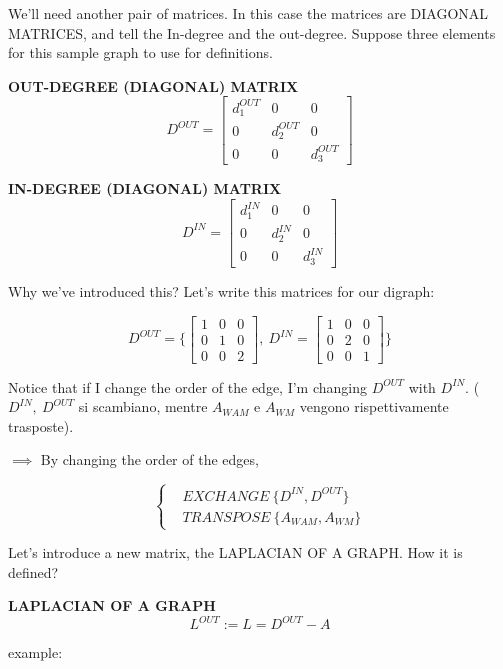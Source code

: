 We'll need another pair of matrices. In this case the matrices are DIAGONAL MATRICES, and tell the In-degree and the out-degree. Suppose three elements for this sample graph to use for definitions.

\begin{defn}{\textbf{OUT-DEGREE (DIAGONAL) MATRIX}}
\[
	D^{OUT} = \begin{bmatrix}d_1^{OUT}&0&0\\0&d_2^{OUT}&0\\0&0&d_3^{OUT}\end{bmatrix}
\]
\end{defn}
\begin{defn}{\textbf{IN-DEGREE (DIAGONAL) MATRIX}}
\[
	D^{IN} = \begin{bmatrix}d_1^{IN}&0&0\\0&d_2^{IN}&0\\0&0&d_3^{IN}\end{bmatrix}
\]
\end{defn}

Why we've introduced this? Let's write this matrices for our digraph:

\[
	D^{OUT} = \Biggl\{ \begin{bmatrix}1&0&0\\0&1&0\\0&0&2\end{bmatrix},\ 
	D^{IN} = \begin{bmatrix}1&0&0\\0&2&0\\0&0&1\end{bmatrix}\Biggr\}
\]

Notice that if I change the order of the edge, I'm changing $D^{OUT}$ with $D^{IN}$. ($D^{IN},\ D^{OUT}$ si scambiano, mentre $A_{WAM}$ e $A_{WM}$ vengono rispettivamente trasposte).

$\implies$ By changing the order of the edges,

\[
	\left\{
	\begin{aligned}
	&EXCHANGE\ \{D^{IN},D^{OUT}\} \\
	&TRANSPOSE\ \{A_{WAM},A_{WM}\} 
	\end{aligned} 
	\right.
\]

Let's introduce a new matrix, the LAPLACIAN OF A GRAPH. How it is defined?
\begin{defn}{\textbf{LAPLACIAN OF A GRAPH}}
\[
	L^{OUT} := L = D^{OUT}-A
\]
\end{defn}

example:

